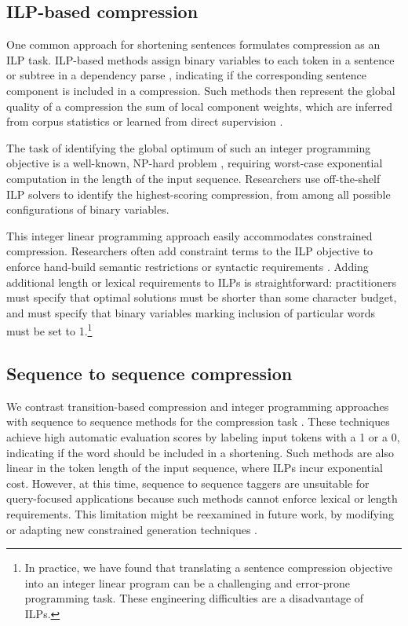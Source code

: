 \documentclass[11pt,a4paper]{article}
\begin{document}
\subsection{ILP-based compression}\label{s:ilps}

One common approach for shortening sentences formulates compression as an ILP task. ILP-based methods assign binary variables to each token in a sentence \cite{clarke2008global} or subtree in a dependency parse \cite{filippova2008dependency}, indicating if the corresponding sentence component is included in a compression. Such methods then represent the global quality of a compression the sum of local component weights, which are inferred from corpus statistics \cite{clarke2008global,filippova2008dependency} or learned from direct supervision \cite{filippova2013overcoming,Wang2017CanSH}.

The task of identifying the global optimum of such an integer programming objective is a well-known, NP-hard problem \cite{clarke2008global}, requiring worst-case exponential computation in the length of the input sequence. Researchers use off-the-shelf ILP solvers to identify the highest-scoring compression, from among all possible configurations of binary variables. 

This integer linear programming approach easily accommodates constrained compression. Researchers often add constraint terms to the ILP objective to enforce hand-build semantic restrictions \cite{clarke2008global} or syntactic requirements \cite{filippova2008dependency}. Adding additional length or lexical requirements to ILPs is straightforward: practitioners must specify that optimal solutions must be shorter than some character budget, and must specify that binary variables marking inclusion of particular words must be set to 1.\footnote{In practice, we have found that translating a sentence compression objective into an integer linear program can be a challenging and error-prone programming task. These engineering difficulties are a disadvantage of ILPs.}

\subsection{Sequence to sequence compression}

We contrast transition-based compression and integer programming approaches with sequence to sequence methods for the compression task \cite{filippova2015sentence}. These techniques achieve high automatic evaluation scores by labeling input tokens with a 1 or a 0, indicating if the word should be included in a shortening. Such methods are also linear in the token length of the input sequence, where ILPs incur exponential cost. However, at this time, sequence to sequence taggers are unsuitable for query-focused applications because such methods cannot enforce lexical or length requirements. This limitation might be reexamined in future work, by modifying or adapting new constrained generation techniques \cite{N18-1119,aaimh}.
\end{document}
